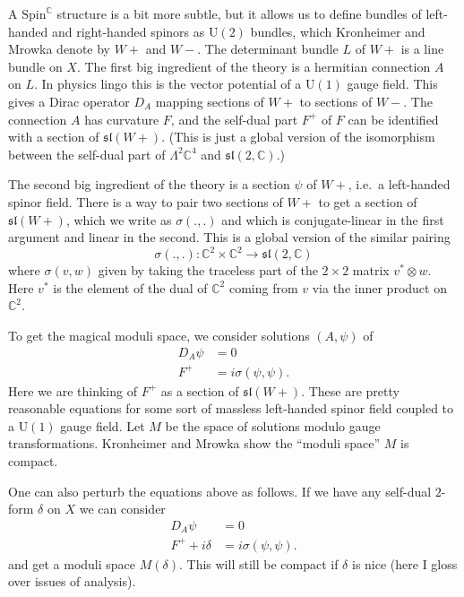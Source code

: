 \documentclass[12pt]{article}
\begin{document}
A $\mathrm{Spin}^{\mathbb{C}}$ structure is a bit more subtle, but it allows us to define
bundles of left-handed and right-handed spinors as \(\mathrm{U}(2)\)
bundles, which Kronheimer and Mrowka denote by \(W+\) and \(W-\). The
determinant bundle \(L\) of \(W+\) is a line bundle on \(X\). The first
big ingredient of the theory is a hermitian connection \(A\) on \(L\).
In physics lingo this is the vector potential of a \(\mathrm{U}(1)\)
gauge field. This gives a Dirac operator \(D_A\) mapping sections of
\(W+\) to sections of \(W-\). The connection \(A\) has curvature \(F\),
and the self-dual part \(F^+\) of \(F\) can be identified with a section
of \(\mathfrak{sl}(W+)\). (This is just a global version of the
isomorphism between the self-dual part of \(\Lambda^2 \mathbb{C}^4\) and
\(\mathfrak{sl}(2,\mathbb{C})\).)

The second big ingredient of the theory is a section \(\psi\) of \(W+\),
i.e.~a left-handed spinor field. There is a way to pair two sections of
\(W+\) to get a section of \(\mathfrak{sl}(W+)\), which we write as
\(\sigma(.,.)\) and which is conjugate-linear in the first argument and
linear in the second. This is a global version of the similar pairing
\[\sigma(.,.)\colon \mathbb{C}^2 \times \mathbb{C}^2 \to \mathfrak{sl}(2,\mathbb{C})\]
where \(\sigma(v,w)\) given by taking the traceless part of the
\(2\times2\) matrix \(v^* \otimes w\). Here \(v^*\) is the element of
the dual of \(\mathbb{C}^2\) coming from \(v\) via the inner product on
\(\mathbb{C}^2\).

To get the magical moduli space, we consider solutions \((A,\psi)\) of
\[\begin{aligned}D_A\psi &= 0 \\ F^+ &= i\sigma(\psi,\psi).\end{aligned}\]
Here we are thinking of \(F^+\) as a section of \(\mathfrak{sl}(W+)\).
These are pretty reasonable equations for some sort of massless
left-handed spinor field coupled to a \(\mathrm{U}(1)\) gauge field. Let
\(M\) be the space of solutions modulo gauge transformations. Kronheimer
and Mrowka show the ``moduli space'' \(M\) is compact.

One can also perturb the equations above as follows. If we have any
self-dual \(2\)-form \(\delta\) on \(X\) we can consider
\[\begin{aligned}D_A\psi &= 0 \\ F^+ +i\delta &= i\sigma(\psi,\psi).\end{aligned}\]
and get a moduli space \(M(\delta)\). This will still be compact if
\(\delta\) is nice (here I gloss over issues of analysis).
\end{document}
